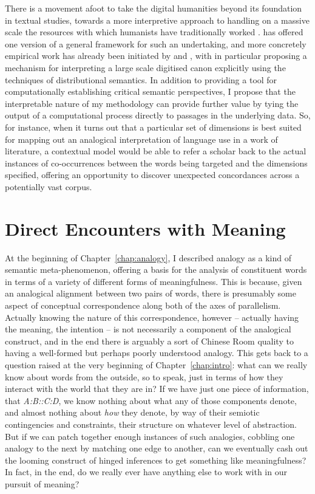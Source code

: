 There is a movement afoot to take the digital humanities beyond its foundation in textual studies, towards a more interpretive approach to handling on a massive scale the resources with which humanists have traditionally worked \citep[see][for an interesting discussion]{AllingtonEA2016}.  \cite{Moretti2013} has offered one version of a general framework for such an undertaking, and more concretely empirical work has already been initiated by \cite{HopeEA2010} and \cite{Ahnert2015}, with \citeauthor{HopeEA2010} in particular proposing a mechanism for interpreting a large scale digitised canon explicitly using the techniques of distributional semantics.  In addition to providing a tool for computationally establishing critical semantic perspectives, I propose that the interpretable nature of my methodology can provide further value by tying the output of a computational process directly to passages in the underlying data.  So, for instance, when it turns out that a particular set of dimensions is best suited for mapping out an analogical interpretation of language use in a work of literature, a contextual model would be able to refer a scholar back to the actual instances of co-occurrences between the words being targeted and the dimensions specified, offering an opportunity to discover unexpected concordances across a potentially vast corpus.

\section{Direct Encounters with Meaning}
At the beginning of Chapter~\ref{chap:analogy}, I described analogy as a kind of semantic meta-phenomenon, offering a basis for the analysis of constituent words in terms of a variety of different forms of meaningfulness.  This is because, given an analogical alignment between two pairs of words, there is presumably some aspect of conceptual correspondence along both of the axes of parallelism.  Actually knowing the nature of this correspondence, however -- actually having the meaning, the intention -- is not necessarily a component of the analogical construct, and in the end there is arguably a sort of Chinese Room \citep{Searle1980} quality to having a well-formed but perhaps poorly understood analogy.  This gets back to a question raised at the very beginning of Chapter~\ref{chap:intro}: what can we really know about words from the outside, so to speak, just in terms of how they interact with the world that they are in?  If we have just one piece of information, that \emph{A:B::C:D}, we know nothing about what any of those components denote, and almost nothing about \emph{how} they denote, by way of their semiotic contingencies and constraints, their structure on whatever level of abstraction.  But if we can patch together enough instances of such analogies, cobbling one analogy to the next by matching one edge to another, can we eventually cash out the looming construct of hinged inferences to get something like meaningfulness?  In fact, in the end, do we really ever have anything else to work with in our pursuit of meaning?

